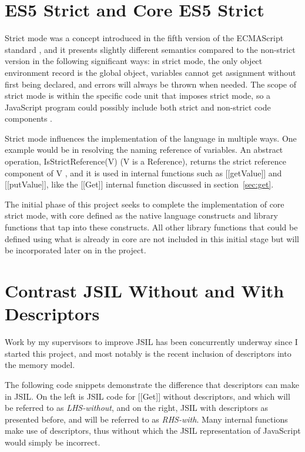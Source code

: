 \documentclass[a4paper,11pt,twoside]{report}
\begin{document}
\section{ES5 Strict and Core ES5 Strict}\label{sec:strict}
Strict mode was a concept introduced in the fifth version of the ECMAScript standard \cite{EcmaScript}, and it presents slightly different semantics compared to the non-strict version in the following significant ways: in strict mode, the only object environment record is the global object, variables cannot get assignment without first being declared, and errors will always be thrown when needed. The scope of strict mode is within the specific code unit that imposes strict mode, so a JavaScript program could possibly include both strict and non-strict code components \cite{EcmaScript}.

Strict mode influences the implementation of the language in multiple ways. One example would be in resolving the naming reference of variables. An abstract operation, IsStrictReference(V) (V is a Reference), returns the strict reference component of V \cite{EcmaScript}, and it is used in internal functions such as [[getValue]] and [[putValue]], like the [[Get]] internal function discussed in section~\ref{sec:get}.

The initial phase of this project seeks to complete the implementation of core strict mode, with core defined as the native language constructs and library functions that tap into these constructs. All other library functions that could be defined using what is already in core are not included in this initial stage but will be incorporated later on in the project.

\section{Contrast JSIL Without and With Descriptors}
Work by my supervisors to improve JSIL has been concurrently underway since I started this project, and most notably is the recent inclusion of descriptors into the memory model.

The following code snippets demonstrate the difference that descriptors can make in JSIL. On the left is JSIL code for [[Get]] without descriptors, and which will be referred to as \textit{LHS-without}, and on the right, JSIL with descriptors as presented before, and will be referred to as \textit{RHS-with}. Many internal functions make use of descriptors, thus without which the JSIL representation of JavaScript would simply be incorrect.
\end{document}

